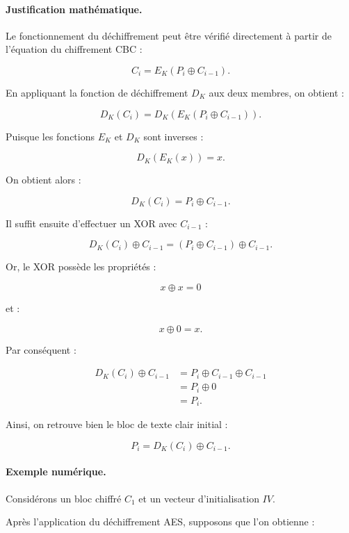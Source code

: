 \documentclass[12pt,a4paper]{article}
\begin{document}
\paragraph{Justification mathématique.}

Le fonctionnement du déchiffrement peut être vérifié directement
à partir de l'équation du chiffrement CBC :

\[
C_i=E_K(P_i\oplus C_{i-1}).
\]

En appliquant la fonction de déchiffrement $D_K$ aux deux membres,
on obtient :

\[
D_K(C_i)
=
D_K\left(E_K(P_i\oplus C_{i-1})\right).
\]

Puisque les fonctions $E_K$ et $D_K$ sont inverses :

\[
D_K(E_K(x))=x.
\]

On obtient alors :

\[
D_K(C_i)=P_i\oplus C_{i-1}.
\]

Il suffit ensuite d'effectuer un XOR avec $C_{i-1}$ :

\[
D_K(C_i)\oplus C_{i-1}
=
(P_i\oplus C_{i-1})\oplus C_{i-1}.
\]

Or, le XOR possède les propriétés :

\[
x\oplus x=0
\]

et :

\[
x\oplus0=x.
\]

Par conséquent :

\[
\begin{aligned}
D_K(C_i)\oplus C_{i-1}
&=
P_i\oplus C_{i-1}\oplus C_{i-1}\\
&=
P_i\oplus0\\
&=
P_i.
\end{aligned}
\]

Ainsi, on retrouve bien le bloc de texte clair initial :

\[
\boxed{
P_i=D_K(C_i)\oplus C_{i-1}.
}
\]



\paragraph{Exemple numérique.}

Considérons un bloc chiffré $C_1$ et un vecteur
d'initialisation $IV$.

Après l'application du déchiffrement AES, supposons que
l'on obtienne :
\end{document}
